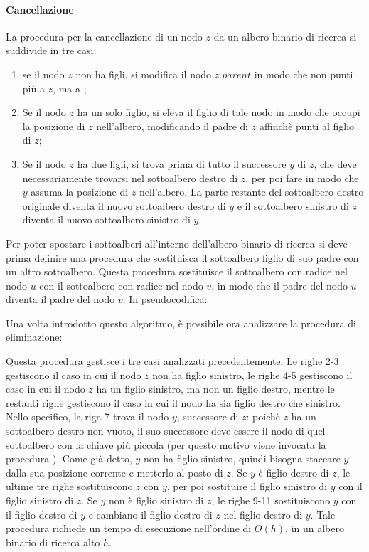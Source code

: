 \paragraph{Cancellazione}
La procedura per la cancellazione di un nodo \(z\) da un albero binario di ricerca si suddivide in tre casi:
\begin{enumerate}
  \item se il nodo \(z\) non ha figli, si modifica il nodo \(z.parent\) in modo che non punti più a \(z\), ma a ;
  \item Se il nodo \(z\) ha un solo figlio, si eleva il figlio di tale nodo in modo che occupi la posizione di \(z\) nell'albero, modificando il padre di \(z\) affinchè punti al figlio di \(z\);
  \item Se il nodo \(z\) ha due figli, si trova prima di tutto il successore \(y\) di \(z\), che deve necessariamente trovarsi nel sottoalbero destro di \(z\), per poi fare in modo che \(y\) assuma la posizione di \(z\) nell'albero. La parte restante del sottoalbero destro originale diventa il nuovo sottoalbero destro di \(y\) e il sottoalbero sinistro di \(z\) diventa il nuovo sottoalbero sinistro di \(y\).
\end{enumerate}

Per poter spostare i sottoalberi all'interno dell'albero binario di ricerca si deve prima definire una procedura che sostituisca il sottoalbero figlio di suo padre con un altro sottoalbero. Questa procedura sostituisce il sottoalbero con radice nel nodo \(u\) con il sottoalbero con radice nel nodo \(v\), in modo che il padre del nodo \(u\) diventa il padre del nodo \(v\). In pseudocodifica:



Una volta introdotto questo algoritmo, è possibile ora analizzare la procedura di eliminazione:



Questa procedura gestisce i tre casi analizzati precedentemente. Le righe 2-3 gestiscono il caso in cui il nodo \(z\) non ha figlio sinistro, le righe 4-5 gestiscono il caso in cui il nodo \(z\) ha un figlio sinistro, ma non un figlio destro, mentre le restanti righe gestiscono il caso in cui il nodo ha sia figlio destro che sinistro. Nello specifico, la riga 7 trova il nodo \(y\), successore di \(z\): poichè \(z\) ha un sottoalbero destro non vuoto, il suo successore deve essere il nodo di quel sottoalbero con la chiave più piccola (per questo motivo viene invocata la procedura ). Come già detto, \(y\) non ha figlio sinistro, quindi bisogna staccare \(y\) dalla sua posizione corrente e metterlo al posto di \(z\). Se \(y\) è figlio destro di \(z\), le ultime tre righe sostituiscono \(z\) con \(y\), per poi sostituire il figlio sinistro di \(y\) con il figlio sinistro di \(z\). Se \(y\) non è figlio sinistro di \(z\), le righe 9-11 sostituiscono \(y\) con il figlio destro di \(y\) e cambiano il figlio destro di \(z\) nel figlio destro di \(y\). Tale procedura richiede un tempo di esecuzione nell'ordine di \(O(h)\), in un albero binario di ricerca alto \(h\).

